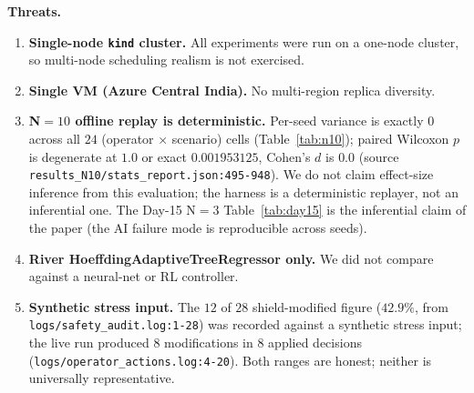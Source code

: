\documentclass[conference,10pt]{IEEEtran}
\begin{document}
\textbf{Threats.}
\begin{enumerate}
    \item \textbf{Single-node \texttt{kind} cluster.} All experiments
          were run on a one-node cluster, so multi-node scheduling
          realism is not exercised.
    \item \textbf{Single VM (Azure Central India).} No multi-region
          replica diversity.
    \item \textbf{N$=10$ offline replay is deterministic.} Per-seed
          variance is exactly $0$ across all $24$ (operator $\times$
          scenario) cells (Table~\ref{tab:n10}); paired Wilcoxon $p$
          is degenerate at $1.0$ or exact $0.001953125$, Cohen's $d$
          is $0.0$ (source \texttt{results\_N10/stats\_report.json:495-948}).
          We do not claim effect-size inference from this evaluation;
          the harness is a deterministic replayer, not an inferential
          one. The Day-15 N$=3$ Table~\ref{tab:day15} is the inferential
          claim of the paper (the AI failure mode is reproducible
          across seeds).
    \item \textbf{River HoeffdingAdaptiveTreeRegressor only.} We did
          not compare against a neural-net or RL controller.
    \item \textbf{Synthetic stress input.} The $12$ of $28$
          shield-modified figure ($42.9\%$, from
          \texttt{logs/safety\_audit.log:1-28}) was recorded against
          a synthetic stress input; the live run produced
          $8$ modifications in $8$ applied decisions
          (\texttt{logs/operator\_actions.log:4-20}). Both ranges are
          honest; neither is universally representative.
\end{enumerate}
\end{document}

